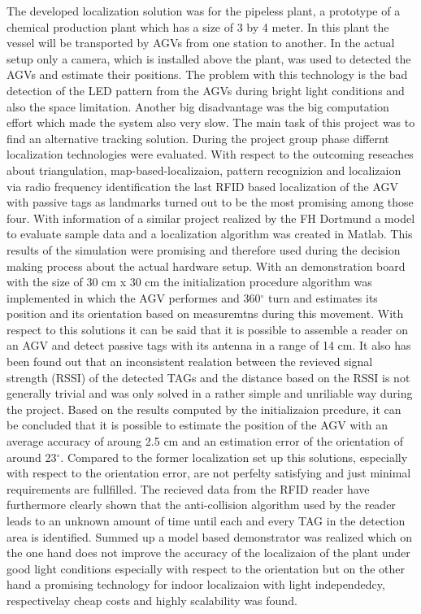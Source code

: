 The developed localization solution was for the pipeless plant, a prototype of a chemical production plant which has a size of 3 by 4 meter. In this plant the vessel will be transported by AGVs from one station to another. In the actual setup only a camera, which is installed above the plant, was used to detected the AGVs and estimate their positions. The problem with this technology is the bad detection of the LED pattern from the AGVs during bright light conditions and also the space limitation. Another big disadvantage was the big computation effort which made the system also very slow. The main task of this project was to find an alternative tracking solution. During the project group phase differnt localization technologies were evaluated. With respect to the outcoming reseaches about triangulation, map-based-localizaion, pattern recognizion and localizaion via radio frequency identification the last RFID based localization of the AGV with passive tags as landmarks turned out to be the most promising among those four. With information of a similar project realized by the FH Dortmund a model to evaluate sample data and a localization algorithm was created in Matlab. This results of the simulation were promising and  therefore used during the decision making process about the actual hardware setup. With an demonstration board with the size of 30 cm x 30 cm the initialization procedure algorithm was implemented in which the AGV performes and 360$^\circ$ turn and estimates its position and its orientation based on measuremtns during this movement. With respect to this solutions it can be said that it is possible to assemble a reader on an AGV and detect passive tags with its antenna in a range of 14 cm. It also has been found out that an inconsistent realation between the revieved signal strength (RSSI) of the detected TAGs and the distance based on the RSSI is not generally trivial and was only solved in a rather simple and unriliable way during the project. Based on the results computed by the initializaion prcedure, it can be concluded that it is possible to estimate the position of the AGV with an average accuracy of aroung 2.5 cm and an estimation error of the orientation of around 23$^\circ$. Compared to the former localization set up this solutions, especially with respect to the orientation error, are not perfelty satisfying and just minimal requirements are fullfilled. The recieved data from the RFID reader have furthermore clearly shown that the anti-collision algorithm used by the reader leads to an unknown amount of time until each and every TAG in the detection area is identified. Summed up a model based demonstrator was realized which on the one hand does not improve the accuracy of the localizaion of the plant under good light conditions especially with respect to the orientation but on the other hand a promising technology for indoor localizaion with light independedcy, respectivelay cheap costs and highly scalability was found. 




